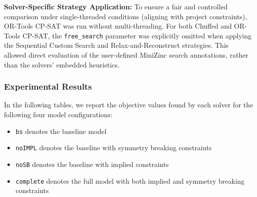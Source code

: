 \textbf{Solver-Specific Strategy Application:}
To ensure a fair and controlled comparison under single-threaded conditions (aligning with project constraints), OR-Tools CP-SAT was run without multi-threading. For both Chuffed and OR-Tools CP-SAT, the \texttt{free\_search} parameter was explicitly omitted when applying the Sequential Custom Search and Relax-and-Reconstruct strategies. This allowed direct evaluation of the user-defined MiniZinc search annotations, rather than the solvers' embedded heuristics.


\subsubsection{Experimental Results}
In the following tables, we report the objective values found by each solver for the following four model configurations:
\begin{itemize}
    \item \texttt{bs} denotes the baseline model
     \item  \texttt{noIMPL} denotes the baseline with symmetry breaking constraints
    \item \texttt{noSB} denotes the baseline with implied constraints
    \item \texttt{complete} denotes the full model with both implied and symmetry breaking constraints
\end{itemize}

